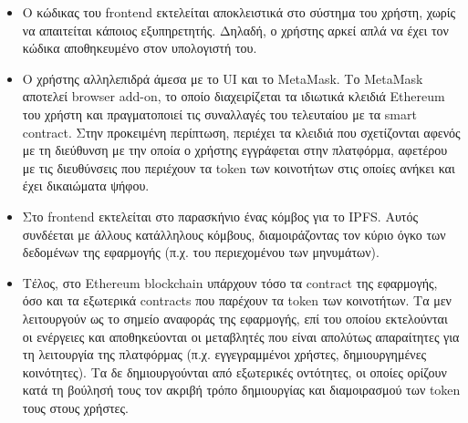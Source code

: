 \begin{itemize}
    \item Ο κώδικας του frontend εκτελείται αποκλειστικά στο σύστημα του χρήστη, χωρίς να απαιτείται κάποιος εξυπηρετητής. Δηλαδή, ο χρήστης αρκεί απλά να έχει τον κώδικα αποθηκευμένο στον υπολογιστή του.
    \item Ο χρήστης αλληλεπιδρά άμεσα με το UI και το MetaMask. Το MetaMask αποτελεί browser add-on, το οποίο διαχειρίζεται τα ιδιωτικά κλειδιά Ethereum του χρήστη και πραγματοποιεί τις συναλλαγές του τελευταίου με τα smart contract. Στην προκειμένη περίπτωση, περιέχει τα κλειδιά που σχετίζονται αφενός με τη διεύθυνση με την οποία ο χρήστης εγγράφεται στην πλατφόρμα, αφετέρου με τις διευθύνσεις που περιέχουν τα token των κοινοτήτων στις οποίες ανήκει και έχει δικαιώματα ψήφου.
    \item Στο frontend εκτελείται στο παρασκήνιο ένας κόμβος για το IPFS. Αυτός συνδέεται με άλλους κατάλληλους κόμβους, διαμοιράζοντας τον κύριο όγκο των δεδομένων της εφαρμογής (π.χ. του περιεχομένου των μηνυμάτων).
    \item Τέλος, στο Ethereum blockchain υπάρχουν τόσο τα contract της εφαρμογής, όσο και τα εξωτερικά contracts που παρέχουν τα token των κοινοτήτων. Τα μεν λειτουργούν ως το σημείο αναφοράς της εφαρμογής, επί του οποίου εκτελούνται οι ενέργειες και αποθηκεύονται οι μεταβλητές που είναι απολύτως απαραίτητες για τη λειτουργία της πλατφόρμας (π.χ. εγγεγραμμένοι χρήστες, δημιουργημένες κοινότητες). Τα δε δημιουργούνται από εξωτερικές οντότητες, οι οποίες ορίζουν κατά τη βούλησή τους τον ακριβή τρόπο δημιουργίας και διαμοιρασμού των token τους στους χρήστες.
\end{itemize}